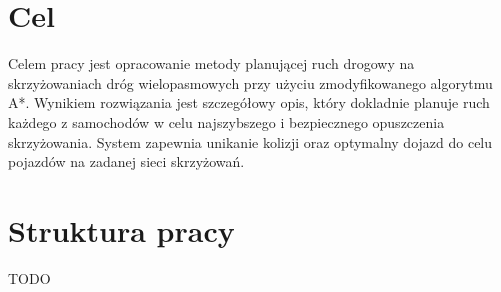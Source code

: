\section{Cel}

Celem pracy jest opracowanie metody planującej ruch drogowy na skrzyżowaniach dróg wielopasmowych przy użyciu zmodyfikowanego algorytmu A*. Wynikiem rozwiązania jest szczegółowy opis, który dokladnie planuje ruch każdego z samochodów w celu najszybszego i bezpiecznego opuszczenia skrzyżowania. System zapewnia unikanie kolizji oraz optymalny dojazd do celu pojazdów na zadanej sieci skrzyżowań.

\section{Struktura pracy}
TODO
